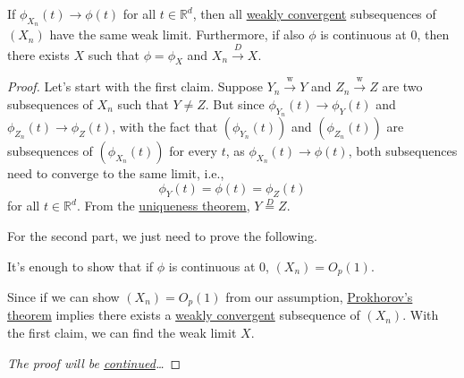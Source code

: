 \begin{theorem}\label{thm:Levy-Cramer-continuity}
	If \(\phi _{X_n}(t) \to \phi (t)\) for all \(t \in \mathbb{R} ^d\), then all \hyperref[def:converge-weakly]{weakly convergent} subsequences of \((X_n)\) have the same weak limit. Furthermore, if also \(\phi \) is continuous at \(0\), then there exists \(X\) such that \(\phi = \phi _X\)  and \(X_n \overset{D}{\to } X\).
\end{theorem}
\begin{proof}\let\qed\relax
	Let's start with the first claim. Suppose \(Y_n \overset{\text{w} }{\to } Y\) and \(Z_n \overset{\text{w} }{\to } Z\) are two subsequences of \(X_n\) such that \(Y \neq Z\). But since \(\phi _{Y_n}(t) \to \phi _Y(t)\) and \(\phi _{Z_n}(t) \to \phi _Z(t)\), with the fact that \((\phi _{Y_n}(t))\) and \((\phi _{Z_n}(t))\) are subsequences of \((\phi _{X_n}(t))\) for every \(t\), as \(\phi _{X_n}(t) \to \phi (t)\), both subsequences need to converge to the same limit, i.e.,
	\[
		\phi _Y(t) = \phi (t) = \phi _Z(t)
	\]
	for all \(t \in \mathbb{R} ^d\). From the \hyperref[thm:characteristic-function-uniqueness]{uniqueness theorem}, \(Y \overset{D}{=} Z\).

	For the second part, we just need to prove the following.
	\begin{claim}
		It's enough to show that if \(\phi \) is continuous at \(0\), \((X_n) = O_p(1)\).
	\end{claim}
	\begin{explanation}
		Since if we can show \((X_n) = O_p(1)\) from our assumption, \hyperref[thm:Prokhorov]{Prokhorov's theorem} implies there exists a \hyperref[def:converge-weakly]{weakly convergent} subsequence of \((X_n)\). With the first claim, we can find the weak limit \(X\).
	\end{explanation}
	\emph{The proof will be \hyperref[pf:thm:Levy-Cramer-continuity]{continued}\dots}
\end{proof}